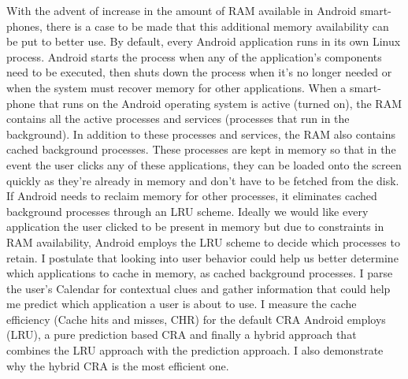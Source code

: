 \documentclass[12pt]{uthesis-v12}  %
\begin{document}

\begin{abstractpage}
With the advent of increase in the amount of RAM available in Android smart-phones, there is a case to be made that this additional memory availability can be put to better use. By default, every Android application runs in its own Linux process. Android starts the process when any of the application's components need to be executed, then shuts down the process when it's no longer needed or when the system must recover memory for other applications. When a smart-phone that runs on the Android operating system is active (turned on), the RAM contains all the active processes and services (processes that run in the background). In addition to these processes and services, the RAM also contains cached background processes. These processes are kept in memory so that in the event the user clicks any of these applications, they can be loaded onto the screen quickly as they're already in memory and don't have to be fetched from the disk. If Android needs to reclaim memory for other processes, it eliminates cached background processes through an LRU scheme. Ideally we would like every application the user clicked to be present in memory but due to constraints in RAM availability, Android employs the LRU scheme to decide which processes to retain. I postulate that looking into user behavior could help us better determine which applications to cache in memory, as cached background processes. I parse the user's Calendar for contextual clues and gather information that could help me predict which application a user is about to use. I measure the cache efficiency (Cache hits and misses, CHR) for the default CRA Android employs (LRU), a pure prediction based CRA and finally a hybrid approach that combines the LRU approach with the prediction approach. I also demonstrate why the hybrid CRA is the most efficient one.


\end{abstractpage}

\end{document}
